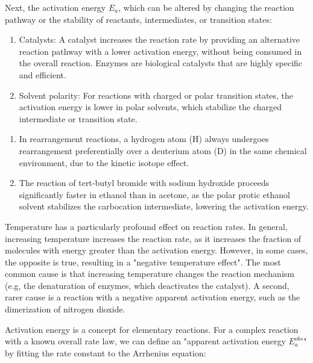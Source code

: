 Next, the activation energy $E_a$, which can be altered by changing the reaction pathway or the stability of reactants, intermediates, or transition states:

\begin{proposition}
  \begin{enumerate}
    \item Catalysts: A catalyst increases the reaction rate by providing an alternative reaction pathway with a lower activation energy, without being consumed in the overall reaction. Enzymes are biological catalysts that are highly specific and efficient.
    \item Solvent polarity: For reactions with charged or polar transition states, the activation energy is lower in polar solvents, which stabilize the charged intermediate or transition state.
  \end{enumerate}
\end{proposition}

\begin{example}
  \begin{enumerate}
    \item In rearrangement reactions, a hydrogen atom ($\text{H}$) always undergoes rearrangement preferentially over a deuterium atom ($\text{D}$) in the same chemical environment, due to the kinetic isotope effect.
    \item The reaction of tert-butyl bromide with sodium hydroxide proceeds significantly faster in ethanol than in acetone, as the polar protic ethanol solvent stabilizes the carbocation intermediate, lowering the activation energy.
  \end{enumerate}
\end{example}

Temperature has a particularly profound effect on reaction rates. In general, increasing temperature increases the reaction rate, as it increases the fraction of molecules with energy greater than the activation energy. However, in some cases, the opposite is true, resulting in a "negative temperature effect". The most common cause is that increasing temperature changes the reaction mechanism (e.g, the denaturation of enzymes, which deactivates the catalyst). A second, rarer cause is a reaction with a negative apparent activation energy, such as the dimerization of nitrogen dioxide.

Activation energy is a concept for elementary reactions. For a complex reaction with a known overall rate law, we can define an "apparent activation energy $E_a^{obs}$" by fitting the rate constant to the Arrhenius equation:

